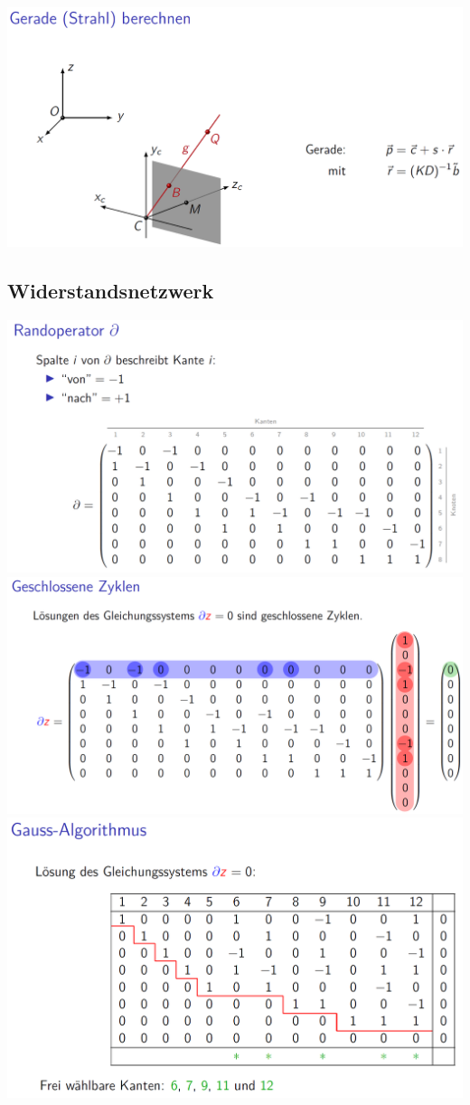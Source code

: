 		 \includegraphics[width=0.9\linewidth]{Bilder/kamera4} 	 
		 
		 
		 
		 
		 
		       
		    
		
		  \subsection{Widerstandsnetzwerk}
		   \includegraphics[width=0.8\linewidth]{Bilder/widerstand2} \\ 
		   
		   \includegraphics[width=0.8\linewidth]{Bilder/widerstand3} \\ 
		   
		   \includegraphics[width=0.8\linewidth]{Bilder/widerstand4} \\ 
		   

